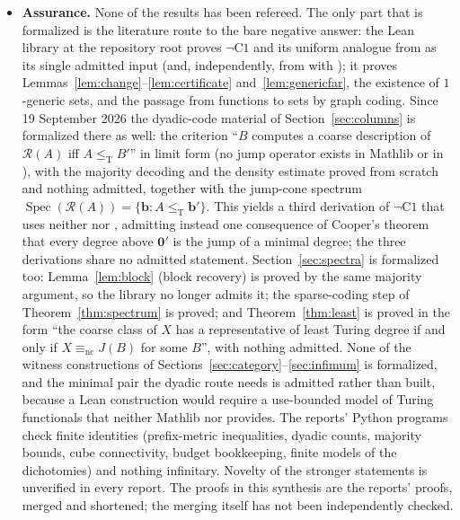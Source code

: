 \documentclass[11pt,letterpaper]{article}
\theoremstyle{definition}
\numberwithin{equation}{section}
\newcommand{\leT}{\le_{\mathrm T}}
\newcommand{\eqnc}{\equiv_{\mathrm{nc}}}
\newcommand{\Spec}{\operatorname{Spec}}
\newcommand{\J}{J}
\newcommand{\Rc}{\mathcal R}
\newcommand{\zero}{\mathbf 0}
\begin{document}
\begin{itemize}
\item \textbf{Assurance.} None of the results has been refereed. The only part that is formalized is the literature route to the bare negative answer: the Lean library  at the repository root proves $\neg\mathrm{C1}$ and its uniform analogue from \cite[Theorem~4.2]{HJKS} as its single admitted input (and, independently, from \cite[Theorem~4.3]{HJKS} with \cite[Theorem~2.26]{JS}); it proves Lemmas~\ref{lem:change}--\ref{lem:certificate} and~\ref{lem:genericfar}, the existence of $1$-generic sets, and the passage from functions to sets by graph coding. Since 19 September 2026 the dyadic-code material of Section~\ref{sec:columns} is formalized there as well: the criterion ``$B$ computes a coarse description of $\Rc(A)$ iff $A\leT B'$'' in limit form (no jump operator exists in Mathlib or in ), with the majority decoding and the density estimate proved from scratch and nothing admitted, together with the jump-cone spectrum $\Spec(\Rc(A))=\{\mathbf b:A\leT\mathbf b'\}$. This yields a third derivation of $\neg\mathrm{C1}$ that uses neither \cite{HJKS} nor \cite{JS}, admitting instead one consequence of Cooper's theorem that every degree above $\zero'$ is the jump of a minimal degree; the three derivations share no admitted statement. Section~\ref{sec:spectra} is formalized too: Lemma~\ref{lem:block} (block recovery) is proved by the same majority argument, so the library no longer admits it; the sparse-coding step of Theorem~\ref{thm:spectrum} is proved; and Theorem~\ref{thm:least} is proved in the form ``the coarse class of $X$ has a representative of least Turing degree if and only if $X\eqnc\J(B)$ for some $B$'', with nothing admitted. None of the witness constructions of Sections~\ref{sec:category}--\ref{sec:infimum} is formalized, and the minimal pair the dyadic route needs is admitted rather than built, because a Lean construction would require a use-bounded model of Turing functionals that neither Mathlib nor  provides. The reports' Python programs check finite identities (prefix-metric inequalities, dyadic counts, majority bounds, cube connectivity, budget bookkeeping, finite models of the dichotomies) and nothing infinitary. Novelty of the stronger statements is unverified in every report. The proofs in this synthesis are the reports' proofs, merged and shortened; the merging itself has not been independently checked.
\end{itemize}
\end{document}

